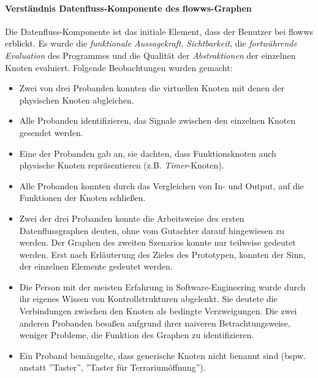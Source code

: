 \paragraph{Verständnis Datenfluss-Komponente des flowws-Graphen} Die Datenfluss-Kom\-po\-nen\-te ist das initiale Element, dass der Benutzer bei flowws erblickt. Es wurde die \textit{funktionale Aussagekraft}, \textit{Sichtbarkeit}, die \textit{fortwährende Evaluation} des Programmes und die Qualität der \textit{Abstraktionen} der einzelnen Knoten evaluiert. Folgende Beobachtungen wurden gemacht: 
\begin{itemize}
    \item Zwei von drei Probanden konnten die virtuellen Knoten mit denen der physischen Knoten abgleichen.
    \item Alle Probanden identifizieren, das Signale zwischen den einzelnen Knoten gesendet werden.
    \item Eine der Probanden gab an, sie dachten, dass Funktionsknoten auch physische Knoten repräsentieren (z.B. \textit{Timer}-Knoten).
    \item Alle Probanden konnten durch das Vergleichen von In- und Output, auf die Funktionen der Knoten schließen.
    \item Zwei der drei Probanden konnte die Arbeitsweise des ersten Datenflussgraphen deuten, ohne vom Gutachter darauf hingewiesen zu werden. Der Graphen des zweiten Szenarios konnte nur teilweise gedeutet werden. Erst nach Erläuterung des Zieles des Prototypen, konnten der Sinn, der einzelnen Elemente gedeutet werden. 
    \item Die Person mit der meisten Erfahrung in Software-Engineering wurde durch ihr eigenes Wissen von Kontrollstrukturen abgelenkt. Sie deutete die Verbindungen zwischen den Knoten als bedingte Verzweigungen. Die zwei anderen Probanden besaßen aufgrund ihrer naiveren Betrachtungsweise, weniger Probleme, die Funktion des Graphen zu identifizieren.
    \item Ein Proband bemängelte, dass generische Knoten nicht benannt sind (bspw. anstatt ''Taster'', ''Taster für Terrariumöffnung'').
\end{itemize}

